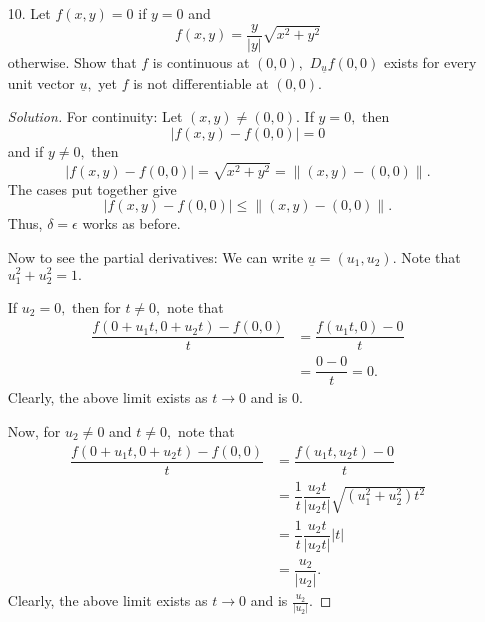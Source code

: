\documentclass[12pt]{article}
\theoremstyle{definition}
\newenvironment{soln}{\begin{proof}[Solution]}{\end{proof}}
\begin{document}
\begin{itemize}
\begin{soln}
		Now, we show neither partial derivative exists. The calculations are similar and we show only the first. For $h \neq 0,$ we note that
		\begin{equation*} 
			\dfrac{f(h, 0) - f(0, 0)}{h} = \dfrac{h\sin(1/h)}{h} = \sin\left(\dfrac{1}{h}\right).
		\end{equation*}
		The limit of the above expression as $h \to 0$ does not exist. Thus, we are done.
	\end{soln}
	\newpage
	\item[10.] Let $f(x, y) = 0$ if $y = 0$ and
	\begin{equation*} 
		f(x, y) = \dfrac{y}{\left|y\right|}\sqrt{x^2 + y^2}
	\end{equation*}
	otherwise. Show that $f$ is continuous at $(0, 0),$ $D_{\underline{u}}f(0, 0)$ exists for every {\color{red}unit} vector $\underline{u},$ yet $f$ is not differentiable at $(0, 0).$
	\begin{soln}
		For continuity: Let $(x, y) \neq (0, 0).$ If $y = 0,$ then\begin{equation*} 
			|f(x, y) - f(0, 0)| = 0
		\end{equation*}
		and if $y \neq 0,$ then
		\begin{equation*} 
			|f(x, y) - f(0, 0)| = \sqrt{x^2 + y^2} = \|(x, y) - (0, 0)\|.
		\end{equation*}
		The cases put together give
		\begin{equation*} 
			|f(x, y) - f(0, 0)| \le \|(x, y) - (0, 0)\|.
		\end{equation*}
		Thus, $\delta = \epsilon$ works as before.

		Now to see the partial derivatives: We can write $\underline{u} = (u_1, u_2).$ Note that $u_1^2 + u_2^2 = 1.$

		If $u_2 = 0,$ then for $t \neq 0,$ note that
		\begin{align*} 
			\dfrac{f(0 + u_1t, 0 + u_2t) - f(0, 0)}{t} &= \dfrac{f(u_1t, 0) - 0}{t}\\
			&= \dfrac{0 - 0}{t} = 0.
		\end{align*}
		Clearly, the above limit exists as $t \to 0$ and is $0.$

		Now, for $u_2 \neq 0$ and $t \neq 0,$ note that
		\begin{align*} 
			\dfrac{f(0 + u_1t, 0 + u_2t) - f(0, 0)}{t} &= \dfrac{f(u_1t, u_2t) - 0}{t}\\
			&=\dfrac{1}{t}\dfrac{u_2t}{\left|u_2t\right|}\sqrt{(u_1^2 + u_2^2)t^2}\\
			&= \dfrac{1}{t}\dfrac{u_2t}{\left|u_2t\right|}\left|t\right|\\
			&= \dfrac{u_2}{\left|u_2\right|}.
		\end{align*}
		Clearly, the above limit exists as $t \to 0$ and is $\frac{u_2}{\left|u_2\right|}.$


\end{soln}
\end{itemize}
\end{document}

